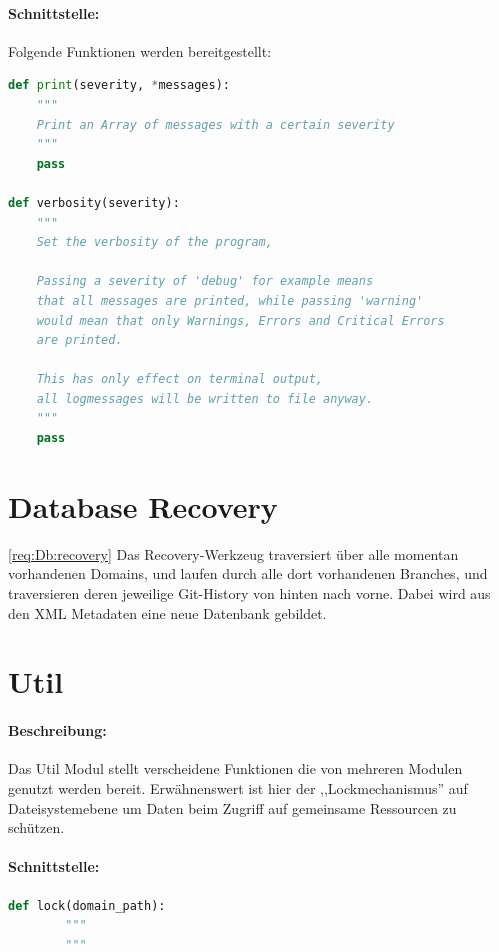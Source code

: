 \paragraph{Schnittstelle:}
\label{par:schnittstelle_}

Folgende Funktionen werden bereitgestellt:
\begin{lstlisting}[language=python]
def print(severity, *messages):
    """
    Print an Array of messages with a certain severity
    """
    pass

def verbosity(severity):
    """
    Set the verbosity of the program, 

    Passing a severity of 'debug' for example means
    that all messages are printed, while passing 'warning'
    would mean that only Warnings, Errors and Critical Errors 
    are printed.

    This has only effect on terminal output,
    all logmessages will be written to file anyway.
    """
    pass
\end{lstlisting}

\section{Database Recovery} 
\label{sec:database_recovery}
\ref{req:Db:recovery}
Das Recovery-Werkzeug traversiert über alle momentan vorhandenen Domains, und laufen durch alle dort vorhandenen Branches, und traversieren deren 
jeweilige Git-History von hinten nach vorne.
Dabei wird aus den XML Metadaten eine neue Datenbank gebildet.

\section{Util} 
\label{sec:util}
\paragraph{Beschreibung:}
\label{par:beschreibung_}
Das Util Modul stellt verscheidene Funktionen die von mehreren Modulen genutzt werden bereit.
Erwähnenswert ist hier der ,,Lockmechanismus''
auf Dateisystemebene um Daten beim Zugriff auf gemeinsame  Ressourcen zu schützen.

\paragraph{Schnittstelle:}
\label{par:schnittstelle_}
\begin{lstlisting}[language=python]
    def lock(domain_path):
        """
        """
\end{lstlisting}



